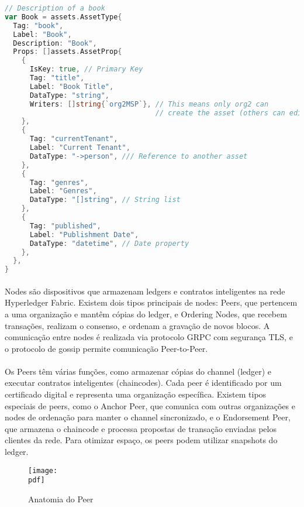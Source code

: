 \documentclass[letterpaper,11pt,leqno]{article}
\newcommand{\pdf}{figures/figures}
\begin{document}
\newpage{}

\begin{lstlisting}[language=Go, caption=Asset Example]
// Description of a book
var Book = assets.AssetType{
  Tag: "book",
  Label: "Book",
  Description: "Book",
  Props: []assets.AssetProp{
    {
      IsKey: true, // Primary Key
      Tag: "title",
      Label: "Book Title",
      DataType: "string",
      Writers: []string{`org2MSP`}, // This means only org2 can
                                    // create the asset (others can edit)
    },
    {
      Tag: "currentTenant",
      Label: "Current Tenant",
      DataType: "->person", /// Reference to another asset
    },
    {
      Tag: "genres",
      Label: "Genres",
      DataType: "[]string", // String list
    },
    {
      Tag: "published",
      Label: "Publishment Date",
      DataType: "datetime", // Date property
    },
  },
}
\end{lstlisting}

\paragraph{}
Nodes são dispositivos que armazenam ledgers e contratos inteligentes na rede
Hyperledger Fabric. Existem dois tipos principais de nodes: Peers, que pertencem
a uma organização e mantêm cópias do ledger, e Ordering Nodes, que recebem
transações, realizam o consenso, e ordenam a gravação de novos blocos. A
comunicação entre nodes é realizada via protocolo GRPC com segurança TLS, e o
protocolo de gossip permite comunicação Peer-to-Peer.

\newpage{}

\paragraph{}
Os Peers têm várias funções, como armazenar cópias do channel (ledger) e
executar contratos inteligentes (chaincodes). Cada peer é identificado por um
certificado digital e representa uma organização específica. Existem tipos
especiais de peers, como o Anchor Peer, que comunica com outras organizações e
nodes de ordenação para manter o channel sincronizado, e o Endorsement Peer, que
armazena o chaincode e processa propostas de transação enviadas pelos clientes
da rede. Para otimizar espaço, os peers podem utilizar snapshots do ledger.

\begin{figure}[H]
	{\texttt{[image: \\pdf]}}
	\caption{Anatomia do Peer}
	\label{f:figure4}\end{figure}
\end{document}
